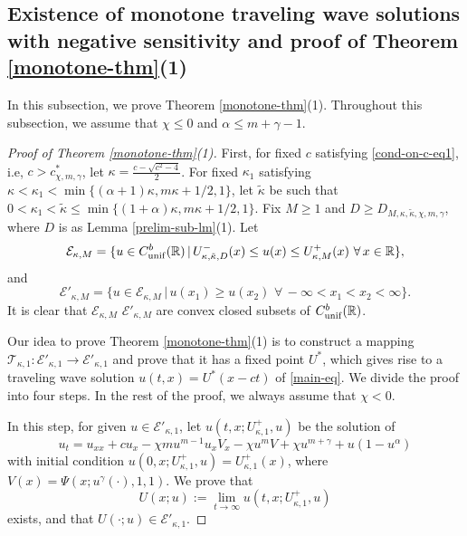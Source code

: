 \documentclass[11pt]{article} %
\theoremstyle{remark}
\theoremstyle{remark}
\numberwithin{equation}{section}
\numberwithin{figure}{section}
\numberwithin{table}{section}
\newcommand\RR{\ensuremath{\mathbb{R}}}
\begin{document}
\subsection{Existence of monotone traveling wave solutions with negative sensitivity and proof of Theorem \ref{monotone-thm}(1)}

In this subsection, we prove Theorem \ref{monotone-thm}(1). Throughout this subsection, we assume that $\chi\le 0$ and $\alpha\le m+\gamma-1$.

\begin{proof}[Proof of Theorem \ref{monotone-thm}(1)]
First, for fixed   $c$ satisfying \eqref{cond-on-c-eq1},  i.e,  $c> c^*_{\chi,m,\gamma}$, let  $\kappa=\frac{c-\sqrt{c^2-4}}{2}$. For fixed
$\kappa_1$ satisfying $\kappa<\kappa_1<   \min\{(\alpha+1)\kappa,   m\kappa+1/2, 1\}$,   let $\tilde \kappa$ be such that
  $0<\kappa_1<\tilde \kappa \le \min\{(1+\alpha)\kappa,  m\kappa+1/2,  1\}$. Fix
$M\ge 1$ and  $D\ge D_{M,\kappa,\tilde\kappa,\chi,m,\gamma}$, where $D$ is as Lemma \ref{prelim-sub-lm}(1).
Let
$$
\mathcal{E}_{\kappa,M}=\{u\in C_{\rm unif}^b(\RR)\,|\, U_{\kappa,\tilde\kappa,D}^-(x) \le u(x)\le U_{\kappa,M}^+(x)\,\, \forall\, x\in\RR\},
$$
and
$$
\mathcal{E}'_{\kappa,M}=\{u\in\mathcal{E}_{\kappa,M}\,|\,  u(x_1)\ge u(x_2)\,\, \forall\, -\infty<x_1<x_2<\infty\}.
$$
It is clear that $\mathcal{E}_{\kappa,M}$ $\mathcal{E}'_{\kappa,M}$ are  convex closed subsets of $C_{\rm unif}^b(\RR)$. 


Our idea to prove Theorem \ref{monotone-thm}(1)  is to construct a mapping
$\mathcal{T}_{\kappa,1}:\mathcal{E}'_{\kappa,1} \to\mathcal{E}'_{\kappa,1} $ and prove that it has a fixed point $U^*$, which gives rise to a traveling wave solution $u(t,x)=U^*(x-ct)$ of \eqref{main-eq}.
We divide the proof into four steps.
In the rest of the proof, we always assume  that $\chi<0$.

\smallskip
 
In this step,   for given $u\in \mathcal{E}'_{\kappa,1} $,  let $u(t,x; U^+_{\kappa,1}, u)$ be the solution of 
\begin{equation}
\label{main-moving-eq2}
u_t=u_{xx}+cu_x-\chi m u^{m-1} u_x V_x -\chi u^m V+\chi u^{m+\gamma}
+u(1-u^\alpha)
\end{equation}
with initial condition  $u(0,x;U_{\kappa,1}^+,u)=U_{\kappa,1}^+(x)$, where
$V(x)=\Psi(x;u^\gamma(\cdot),1,1)$.
 We prove that
$$
U(x;u):=\lim_{t\to\infty} u(t,x;U_{\kappa,1}^+,u)
$$
exists, and that $U(\cdot;u)\in \mathcal{E}'_{\kappa,1}$.


\end{proof}
\end{document}
